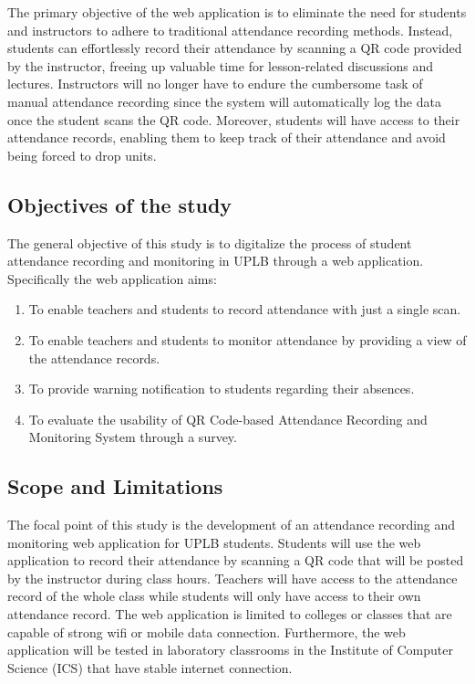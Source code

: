 \documentclass[journal]{./IEEE/IEEEtran}
\begin{document}
The primary objective of the web application is to eliminate the need for students and instructors to adhere to traditional attendance recording methods. Instead, students can effortlessly record their attendance by scanning a QR code provided by the instructor, freeing up valuable time for lesson-related discussions and lectures. Instructors will no longer have to endure the cumbersome task of manual attendance recording since the system will automatically log the data once the student scans the QR code. Moreover, students will have access to their attendance records, enabling them to keep track of their attendance and avoid being forced to drop units.


\subsection{Objectives of the study}
The general objective of this study is to digitalize the process of student attendance recording and monitoring in UPLB through a web application. Specifically the web application aims:
\begin{enumerate}
    \item To enable teachers and students to record attendance with just a single scan.
    \item To enable teachers and students to monitor attendance by providing a view of the attendance records.
    \item To provide warning notification to students regarding their absences.
    \item To evaluate the usability of QR Code-based Attendance Recording and Monitoring System through a survey.
\end{enumerate}

\subsection{Scope and Limitations}
The focal point of this study is the development of an attendance recording and monitoring web application for UPLB students. Students will use the web application to record their attendance by scanning a QR code that will be posted by the instructor during class hours. Teachers will have access to the attendance record of the whole class while students will only have access to their own attendance record. The web application is limited to colleges or classes that are capable of strong wifi or mobile data connection. Furthermore, the web application will be tested in laboratory classrooms in the Institute of Computer Science (ICS) that have stable internet connection. 
\end{document}
